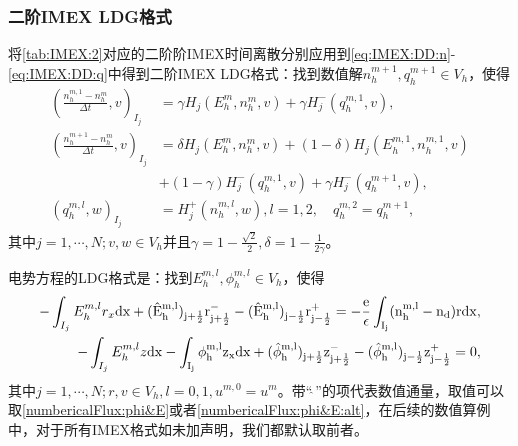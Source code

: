 \subsubsection{二阶IMEX LDG格式}


将\autoref{tab:IMEX:2}对应的二阶阶IMEX时间离散分别应用到\eqref{eq:IMEX:DD:n}-\eqref{eq:IMEX:DD:q}中得到二阶IMEX LDG格式：找到数值解$n_h^{m+1},q_h^{m+1}\in V_h$，使得
\begin{align}
    (\frac{n_h^{m,1} -n_h^m}{\Delta t},v)_{I_j} & = \gamma H_j(E_h^m,n_h^m,v) + \gamma H_j^-(q_h^{m,1},v),              \label{eq:IMEX:2:first} \\
    (\frac{n_h^{m+1} -n_h^m}{\Delta t},v)_{I_j} & = \delta H_j(E_h^m,n_h^m,v) + (1-\delta)H_j(E_h^{m,1},n_h^{m,1},v) \nonumber                  \\
                                                & +(1-\gamma)H_j^-(q_h^{m,1},v) + \gamma H_j^-(q_h^{m+1},v),                                    \\
    (q_h^{m,l},w)_{I_j}                         & = H_j^+(n_h^{m,l},w), l = 1,2, \quad q_h^{m,2} = q_h^{m+1},
\end{align}
其中$j = 1,\cdots,N; v,w \in V_h$并且$\gamma = 1- \frac{\sqrt{2}}{2},\delta = 1 - \frac{1}{2\gamma}$。

电势方程的LDG格式是：找到$E_h^{m,l},\phi_h^{m,l} \in V_h$，使得
\begin{align}
    -\int_{I_j} E_h^{m,l}r_x \rm{d}x + (\hat{E}_h^{m,l})_{j+\frac{1}{2}}r_{j+\frac{1}{2}}^- - (\hat{E}_h^{m,l})_{j-\frac{1}{2}}r_{j-\frac{1}{2}}^+ = -\frac{e}{\epsilon}\int_{I_j}(n_h^{m,l} - n_d) r\rm{d} x, \\
    -\int_{I_j} E_h^{m,l}z \rm{d}x - \int_{I_j} \phi_h^{m,l}z_x \rm{d}x  + (\hat{\phi}_h^{m,l})_{j+\frac{1}{2}}z^-_{j+\frac{1}{2}} - (\hat{\phi}_h^{m,l})_{j-\frac{1}{2}}z_{j-\frac{1}{2}}^+  = 0, \label{eq:IMEX:2:last}
\end{align}
其中$j = 1,\cdots,N; r,v \in V_h, l = 0,1, u^{m,0} = u^m$。带“$\widehat{\ }$”的项代表数值通量，取值可以取\eqref{numbericalFlux:phi&E}或者\eqref{numbericalFlux:phi&E:alt}，在后续的数值算例中，对于所有IMEX格式如未加声明，我们都默认取前者。


